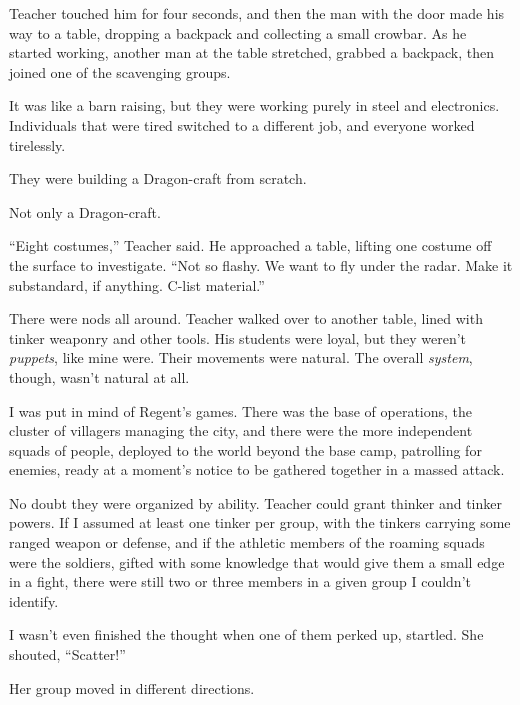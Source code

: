Teacher touched him for four seconds, and then the man with the door made his way to a table, dropping a backpack and collecting a small crowbar.  As he started working, another man at the table stretched, grabbed a backpack, then joined one of the scavenging groups.



It was like a barn raising, but they were working purely in steel and electronics. Individuals that were tired switched to a different job, and everyone worked tirelessly.



They were building a Dragon-craft from scratch.



Not only a Dragon-craft.



``Eight costumes,'' Teacher said.  He approached a table, lifting one costume off the surface to investigate.  ``Not so flashy.  We want to fly under the radar.  Make it substandard, if anything.  C-list material.''



There were nods all around.  Teacher walked over to another table, lined with tinker weaponry and other tools.  His students were loyal, but they weren't \emph{puppets}, like mine were.  Their movements were natural.  The overall \emph{system}, though, wasn't natural at all.



I was put in mind of Regent's games.  There was the base of operations, the cluster of villagers managing the city, and there were the more independent squads of people, deployed to the world beyond the base camp, patrolling for enemies, ready at a moment's notice to be gathered together in a massed attack.



No doubt they were organized by ability.  Teacher could grant thinker and tinker powers.  If I assumed at least one tinker per group, with the tinkers carrying some ranged weapon or defense, and if the athletic members of the roaming squads were the soldiers, gifted with some knowledge that would give them a small edge in a fight, there were still two or three members in a given group I couldn't identify.



I wasn't even finished the thought when one of them perked up, startled.  She shouted, ``Scatter!''



Her group moved in different directions.



